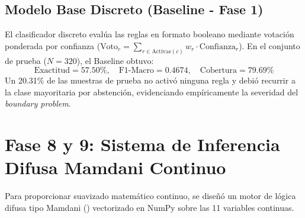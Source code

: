 \documentclass[11pt,a4paper]{article}
\begin{document}
\subsection{Modelo Base Discreto (Baseline - Fase 1)}
El clasificador discreto evalúa las reglas en formato booleano mediante votación ponderada por confianza ($\text{Voto}_c = \sum_{r \in \text{Activas}(c)} w_r \cdot \text{Confianza}_r$). En el conjunto de prueba ($N=320$), el Baseline obtuvo:
\begin{equation*}
\text{Exactitud} = 57.50\%, \quad \text{F1-Macro} = 0.4674, \quad \text{Cobertura} = 79.69\%
\end{equation*}
Un 20.31\% de las muestras de prueba no activó ninguna regla y debió recurrir a la clase mayoritaria por abstención, evidenciando empíricamente la severidad del \textit{boundary problem}.

\section{Fase 8 y 9: Sistema de Inferencia Difusa Mamdani Continuo}

Para proporcionar suavizado matemático continuo, se diseñó un motor de lógica difusa tipo Mamdani (\cite{mamdani1975experiment}) vectorizado en NumPy sobre las 11 variables continuas.
\end{document}
